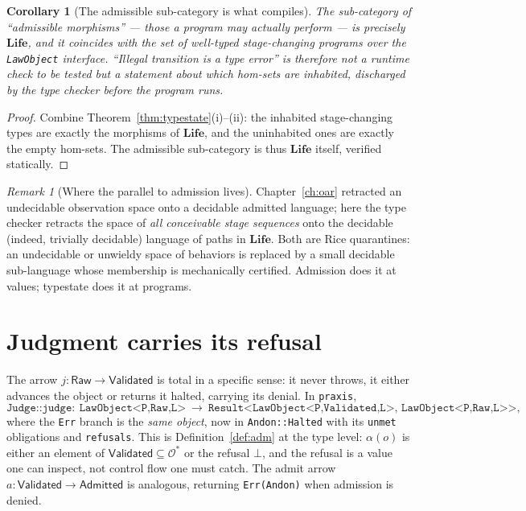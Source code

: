 \documentclass[11pt,oneside]{book}
\theoremstyle{definition}
\theoremstyle{plain}
\newtheorem{corollary}[theorem]{Corollary}
\theoremstyle{remark}
\newtheorem*{remark}{Remark}
\newcommand{\Adm}{\mathcal{O}^{*}}             %
\newcommand{\adm}{\alpha}                      %
\newcommand{\Rfsl}{\bot}                        %
\newcommand{\Raw}{\mathsf{Raw}}
\newcommand{\Val}{\mathsf{Validated}}
\newcommand{\Admd}{\mathsf{Admitted}}
\newcommand{\Life}{\mathbf{Life}}
\newcommand{\code}[1]{\texttt{#1}}
\begin{document}
\begin{corollary}[The admissible sub-category is what compiles]\label{cor:subcat}
The sub-category of ``admissible morphisms'' --- those a program may actually perform --- is
precisely $\Life$, and it coincides with the set of well-typed stage-changing programs over
the \code{LawObject} interface. ``Illegal transition is a type error'' is therefore not a
runtime check to be tested but a statement about which hom-sets are inhabited, discharged by
the type checker before the program runs.
\end{corollary}

\begin{proof}
Combine Theorem~\ref{thm:typestate}(i)--(ii): the inhabited stage-changing types are exactly
the morphisms of $\Life$, and the uninhabited ones are exactly the empty hom-sets. The
admissible sub-category is thus $\Life$ itself, verified statically. \end{proof}

\begin{remark}[Where the parallel to admission lives]
Chapter~\ref{ch:oar} retracted an undecidable observation space onto a decidable admitted
language; here the type checker retracts the space of \emph{all conceivable stage sequences}
onto the decidable (indeed, trivially decidable) language of paths in $\Life$. Both are Rice
quarantines: an undecidable or unwieldy space of behaviors is replaced by a small decidable
sub-language whose membership is mechanically certified. Admission does it at values;
typestate does it at programs.
\end{remark}

\section{Judgment carries its refusal}

The arrow $j:\Raw\to\Val$ is total in a specific sense: it never throws, it either advances
the object or returns it halted, carrying its denial. In \code{praxis},
\[
\code{Judge::judge}:\ \code{LawObject<P,Raw,L>}\ \longrightarrow\
\code{Result<LawObject<P,Validated,L>,\ LawObject<P,Raw,L>>},
\]
where the \code{Err} branch is the \emph{same object}, now in \code{Andon::Halted} with its
\code{unmet} obligations and \code{refusals}. This is Definition~\ref{def:adm} at the type
level: $\adm(o)$ is either an element of $\Val\subseteq\Adm$ or the refusal $\Rfsl$, and the
refusal is a value one can inspect, not control flow one must catch. The admit arrow
$a:\Val\to\Admd$ is analogous, returning \code{Err(Andon)} when admission is denied.
\end{document}
